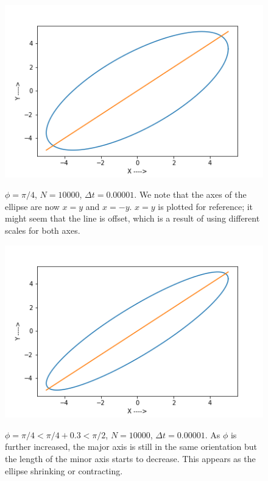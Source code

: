 \documentclass{report}
\begin{document}
\begin{figure}[H]
	\centering
	\includegraphics[width = \textwidth]{phiC.png}
	\label{phiC}
	\caption{$\phi=\pi/4$, $N=10000$, $\Delta t=0.00001$. We note that the axes of the ellipse are now $x=y$ and $x=-y$. $x=y$ is plotted for reference; it might seem that the line is offset, which is a result of using different scales for both axes.}
\end{figure}

\begin{figure}[H]
	\centering
	\includegraphics[width = \textwidth]{phiD.png}
	\label{phiD}
	\caption{$\phi=\pi/4<\pi/4+0.3<\pi/2$, $N=10000$, $\Delta t=0.00001$. As  $\phi$ is further increased, the major axis is still in the same orientation but the length of the minor axis starts to decrease. This appears as the ellipse shrinking or contracting.}
\end{figure}
\end{document}
